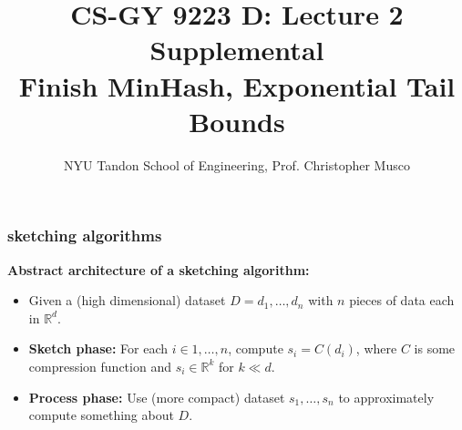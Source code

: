 \documentclass[handout,compress]{beamer}
\title{CS-GY 9223 D: Lecture 2 Supplemental \\ Finish MinHash, Exponential Tail Bounds}
\author{NYU Tandon School of Engineering, Prof. Christopher Musco}
\date{}
\newcommand{\R}{\mathbb{R}}
\begin{document}
\begin{frame}
	\titlepage 
\end{frame}



\begin{frame}
	\frametitle{sketching algorithms}
	\textbf{Abstract architecture of a sketching algorithm:}
	\begin{itemize}
		\item Given a (high dimensional) dataset $D = {d_1, \ldots, d_n}$ with $n$ pieces of data each in $\R^d$.
		\item \textbf{Sketch phase:} For each $i \in 1, \ldots, n$, compute $s_i = C(d_i)$, where $C$ is some compression function and $s_i \in \R^k$ for $k \ll d$.
		\item \textbf{Process phase:} Use (more compact) dataset $s_1, \ldots, s_n$ to approximately compute something about $D$.
	\end{itemize}
	
	\vspace{1em}
\end{frame}
\end{document}
